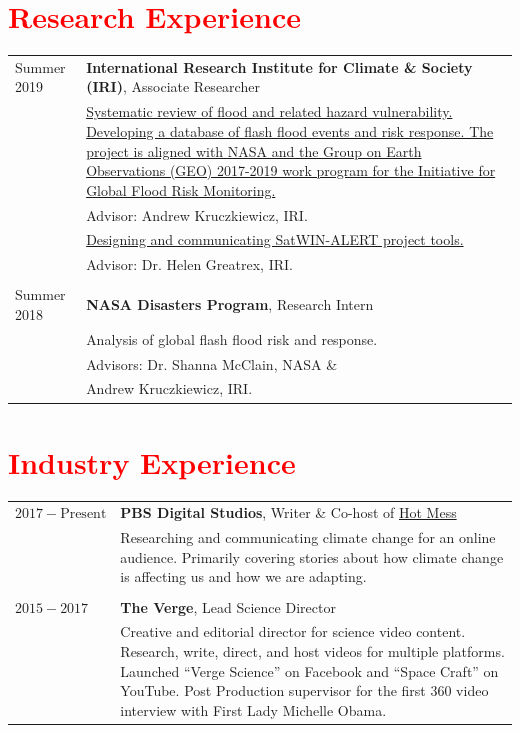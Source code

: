 \documentclass[margin, line, palatino, courier, 10pt]{res}
\begin{document}
\begin{resume}
\section{\sc \textcolor{Red}{\large{Research Experience}}}
\vspace*{0.05in}
\begin{tabular}{@{}p{1 in}p{4in}}
Summer 2019  & \textbf{International Research Institute for Climate \& Society (IRI)}, Associate Researcher\\
& \href{GEO}{Systematic review of flood and related hazard vulnerability.  Developing a database of flash flood events and risk response. The project is aligned with NASA and the Group on Earth Observations (GEO) 2017-2019 work program for the Initiative for Global Flood Risk Monitoring.} \\
& \hspace{0.2in} Advisor: Andrew Kruczkiewicz, IRI.\\
& \href{SatWIN}{Designing and communicating SatWIN-ALERT project tools.} \\
& \hspace{0.2in} Advisor: Dr. Helen Greatrex, IRI. \ 
\\ \\
Summer 2018 & \textbf{NASA Disasters Program}, Research Intern  \\
& Analysis of global flash flood risk and response.  \\
& \hspace{0.2in} Advisors:  Dr. Shanna McClain, NASA \& \\
& \hspace{.82in} Andrew Kruczkiewicz, IRI. \\

\end{tabular}

\section{\sc \textcolor{Red}{\large{Industry Experience}}}
\vspace*{0.05in}
\begin{tabular}{@{}p{1 in}p{4in}}
$2017 - \text{Present}$  & \textbf{PBS Digital Studios}, Writer \& Co-host of \href{HM}{Hot Mess}\\
& Researching and communicating climate change for an online audience. Primarily covering stories about how climate change is affecting us and how we are adapting.\\
\\
$2015 - 2017$ & \textbf{The Verge}, Lead Science Director  \\
& Creative and editorial director for science video content. Research, write, direct, and host videos for multiple platforms. Launched “Verge Science” on Facebook and “Space Craft” on YouTube.  Post Production supervisor for the first 360 video interview with First Lady Michelle Obama. \\


\end{tabular}
\end{resume}
\end{document}
